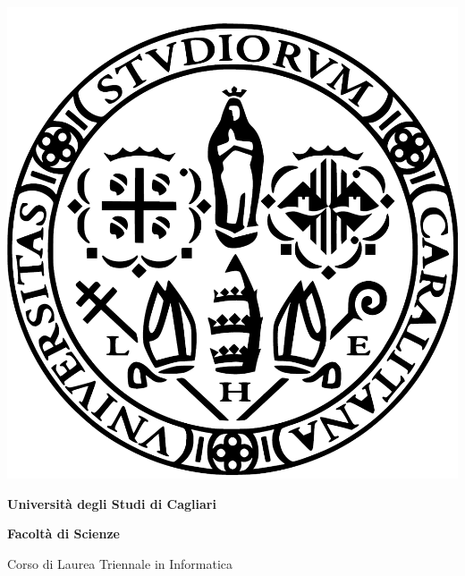 \begin{center}
    {\Large \thispagestyle{empty}}{\includegraphics[scale=0.1]{images/logo.png}}\par
\end{center}

\noindent 
\begin{center}
    \textbf{\Large Università degli Studi di Cagliari}%
\end{center}%
\vspace{-1em}
\noindent 
\begin{center}
    \textbf{\large Facoltà di Scienze}\par
\end{center}{\large \par}
\vspace{-1em}
\noindent
\begin{center}
    {\large Corso di Laurea Triennale in Informatica}\par
\end{center}{\large \par}

